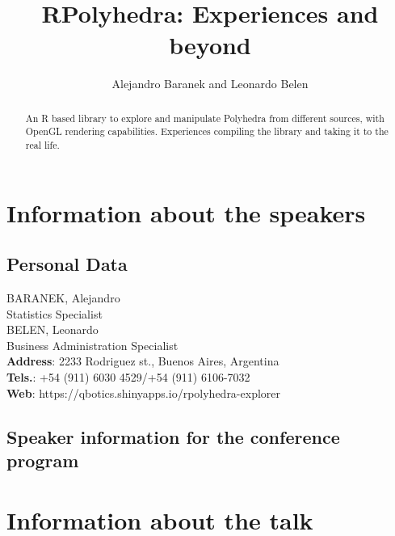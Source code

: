 \documentclass[a4paper,10pt]{article}
\title{RPolyhedra: Experiences and beyond}
\author{Alejandro Baranek and Leonardo Belen}
\begin{document}
\maketitle
\thispagestyle{Title} 


\begin{abstract}
An R based library to explore and manipulate Polyhedra from different sources, with OpenGL rendering capabilities. Experiences compiling the library and taking it to the real life.  
\end{abstract}


\section{Information about the speakers}

\subsection{Personal Data}
BARANEK, Alejandro \\
Statistics Specialist \\
BELEN, Leonardo \\
Business Administration Specialist \\

\textbf{Address}: 2233 Rodriguez st., Buenos Aires, Argentina \\
\textbf{Tels.}: +54 (911) 6030 4529/+54 (911) 6106-7032\\
\textbf{Web}: https://qbotics.shinyapps.io/rpolyhedra-explorer \\



\subsection{Speaker information for the conference program}






     

\section{Information about the talk}
\end{document}
